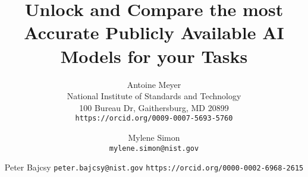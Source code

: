 \documentclass[10pt,twocolumn,letterpaper]{article}
\title{Unlock and Compare the most Accurate Publicly Available AI Models for your Tasks}
\author{Antoine Meyer\\
National Institute of Standards and Technology\\
100 Bureau Dr, Gaithersburg, MD 20899\\
{\tt\small https://orcid.org/0009-0007-5693-5760}
\and
Mylene Simon\\
{\tt\small mylene.simon@nist.gov}
\and
Peter Bajcsy
{\tt\small peter.bajcsy@nist.gov}
{\tt\small https://orcid.org/0000-0002-6968-2615}
}
\begin{document}
\maketitle





{
    \small
    
    
}

% 
\end{document}
